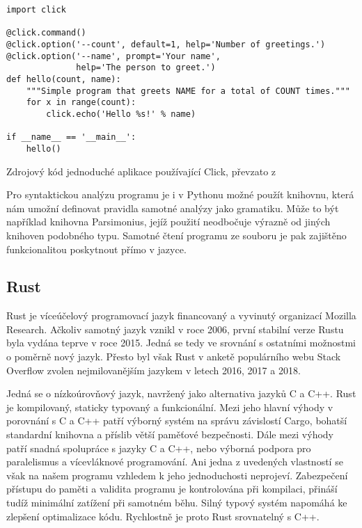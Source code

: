 \begin{listing}
\begin{verbatim}
import click

@click.command()
@click.option('--count', default=1, help='Number of greetings.')
@click.option('--name', prompt='Your name',
              help='The person to greet.')
def hello(count, name):
    """Simple program that greets NAME for a total of COUNT times."""
    for x in range(count):
        click.echo('Hello %s!' % name)

if __name__ == '__main__':
    hello()
\end{verbatim}
\caption{Zdrojový kód jednoduché aplikace používající Click, převzato z \cite{website-click}}
\label{fig:click-source}
\end{listing}

Pro syntaktickou analýzu programu je i v Pythonu možné použít knihovnu, která nám umožní definovat pravidla samotné analýzy jako gramatiku. Může to být například knihovna Parsimonius\todocite, jejíž použití neodbočuje výrazně od jiných knihoven podobného typu. Samotné čtení programu ze souboru je pak zajištěno funkcionalitou poskytnout přímo v jazyce.

\subsection{Rust}
\label{assembler:rust}

Rust je víceúčelový programovací jazyk financovaný a vyvinutý organizací Mozilla Research\cite{rust-faq}. Ačkoliv samotný jazyk vznikl v roce 2006\cite{rust-faq}, první stabilní verze Rustu byla vydána teprve v roce 2015\cite{rust-faq}. Jedná se tedy ve srovnání s ostatními možnostmi o poměrně nový jazyk. Přesto byl však Rust v anketě populárního webu Stack Overflow zvolen nejmilovanějším jazykem v letech 2016\cite{so-survey-2016}, 2017\cite{so-survey-2017} a 2018\cite{so-survey-2018}.

Jedná se o nízkoúrovňový jazyk, navržený jako alternativa jazyků C a C++. Rust je kompilovaný, staticky typovaný a funkcionální\cite{rust-faq}. Mezi jeho hlavní výhody v porovnání s C a C++ patří výborný systém na správu závislostí Cargo, bohatší standardní knihovna a příslib větší paměťové bezpečnosti. Dále mezi výhody patří snadná spolupráce s jazyky C a C++, nebo výborná podpora pro paralelismus a vícevláknové programování. Ani jedna z uvedených vlastností se však na našem programu vzhledem k jeho jednoduchosti neprojeví. Zabezpečení přístupu do paměti a validita programu je kontrolována při kompilaci\cite{rust-faq}, přináší tudíž minimální zatížení při samotném běhu. Silný typový systém napomáhá ke zlepšení optimalizace kódu. Rychlostně je proto Rust srovnatelný s C++\cite{rust-vs-cpp}.

